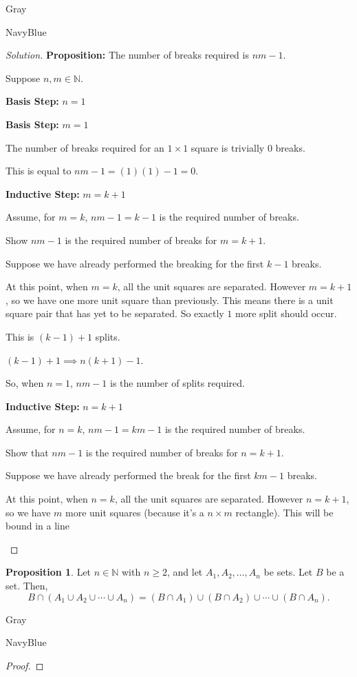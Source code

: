 \documentclass[12pt]{amsart}
\theoremstyle{named}
\newenvironment{prf}
{\medskip\begin{color}{Gray}\begin{framed}\begin{color}{NavyBlue}\begin{proof}[Proof]
\doublespacing}
{\end{proof}\end{color}\end{framed}\end{color}\medskip}
\newenvironment{soln}
{\begin{color}{Gray}\begin{framed}\begin{color}{NavyBlue}\begin{proof}[Solution]
\doublespacing}
{\end{proof}\end{color}\end{framed}\end{color}}
\theoremstyle{definition}
\newtheorem{proposition}{Proposition}
\newcommand{\N}{\mathbb N}
\begin{document}
\begin{soln}
	\phantom{ }

	\textbf{Proposition: } The number of breaks required is $nm - 1$. 

	Suppose $n,m \in \mathbb N$.

	\textbf{Basis Step:} $n = 1$
	\begin{adjustwidth}{2em}{0em}
		\textbf{Basis Step:} $m = 1$
		\begin{adjustwidth}{2em}{0em}
			The number of breaks required for an $1 \times 1$ square is trivially $0$ breaks.

			This is equal to $nm - 1 = (1)(1) - 1 = 0$. 
		\end{adjustwidth}

		\textbf{Inductive Step:} $m = k + 1$
		\begin{adjustwidth}{2em}{0em}
			Assume, for $m = k$, $nm - 1 = k - 1$ is the required number of breaks. 

			Show $nm - 1$ is the required number of breaks for $m = k + 1$.

			Suppose we have already performed the breaking for the first $k - 1$
			breaks. 
			
			At this point, when $m = k$, all the unit squares are separated. However
			$m = k + 1$, so we have one more unit square than previously. This means
			there is a unit square pair that has yet to be separated. So exactly $1$
			more split should occur.

			This is $(k - 1) + 1$ splits.

			$(k - 1) + 1 \implies n(k + 1) - 1$.
		\end{adjustwidth}

		So, when $n = 1$, $nm - 1$ is the number of splits required. 
	\end{adjustwidth}

	\textbf{Inductive Step:} $n = k + 1$
	\begin{adjustwidth}{2em}{0em}
		Assume, for $n = k$, $nm - 1 = km - 1$ is the required number of breaks.
		
		Show that $nm - 1$ is the required number of breaks for $n = k + 1$.

		Suppose we have already performed the break for the first $km - 1$ breaks. 

		At this point, when $n = k$, all the unit squares are separated. However
		$n = k + 1$, so we have $m$ more unit squares (because it's a $n \times m$
		rectangle). This will be bound in a line 
	\end{adjustwidth}
\end{soln}


\begin{proposition}
	Let $n\in\N$ with $n\geq 2$, and let $A_1, A_2, \ldots, A_n$ be sets.
	Let $B$ be a set.
	Then,
	$$B\cap(A_1\cup A_2\cup \cdots\cup A_n) = (B\cap A_1)\cup (B\cap A_2) \cup \cdots \cup (B\cap A_n).$$
\end{proposition}

\begin{prf}
		
\end{prf}
\end{document}
